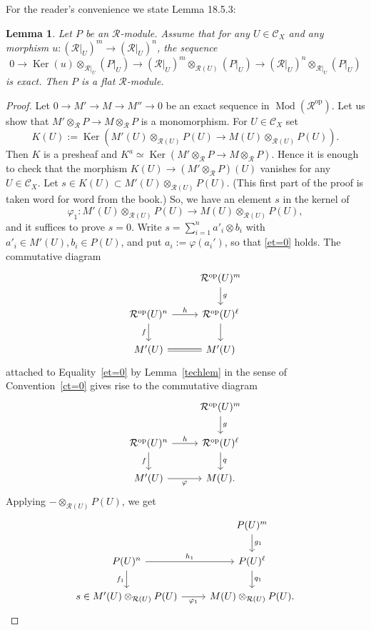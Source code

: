 \documentclass[12pt]{article}
\newtheorem{lem}[thm]{Lemma}
\theoremstyle{remark}
\theoremstyle{definition}
\newcommand{\cc}{\mathcal}
\newcommand{\C}{\mathcal C}
\DeclareMathOperator{\Ker}{Ker}
\DeclareMathOperator{\Mod}{Mod}
\DeclareMathOperator{\op}{op}
\begin{document}
For the reader's convenience we state Lemma 18.5.3: 
%
\begin{lem}\label{l1853}
Let $P$ be an $\cc R$-module. Assume that for any $U\in\C_X$ and any morphism $u:(\cc R|_U)^m\to(\cc R|_U)^n$, the sequence 
$$
0\to\Ker(u)\otimes_{\cc R|_U}(P|_U)\to(\cc R|_U)^m\otimes_{\cc R(U)}(P|_U)\to(\cc R|_U)^n\otimes_{\cc R|_U}(P|_U)
$$ 
is exact. Then $P$ is a flat $\cc R$-module.
\end{lem}
%
\begin{proof}
Let $0\to M'\to M\to M''\to0$ be an exact sequence in $\Mod(\cc R^{\op})$. Let us show that $M'\otimes_{\cc R}P\to M\otimes_{\cc R}P$ is a monomorphism. For $U\in\C_X$ set 
$$
K(U):=\Ker\left(M'(U)\otimes_{\cc R(U)}P(U)\to M(U)\otimes_{\cc R(U)}P(U)\right).
$$ 
Then $K$ is a presheaf and $K^a\simeq\Ker(M'\otimes_{\cc R}P\to M\otimes_{\cc R}P)$. Hence it is enough to check that the morphism $K(U)\to(M'\otimes_{\cc R}P)(U)$ vanishes for any $U\in\C_X$. Let $s\in K(U)\subset M'(U)\otimes_{\cc R(U)}P(U)$. (This first part of the proof is taken word for word from the book.) So, we have an element $s$ in the kernel of 
$$
\varphi_1:M'(U)\otimes_{\cc R(U)}P(U)\to M(U)\otimes_{\cc R(U)}P(U),
$$ 
and it suffices to prove $s=0$. Write $s=\sum_{i=1}^na'_i\otimes b_i$ with $a'_i\in M'(U),b_i\in P(U)$, and put $a_i:=\varphi(a_i')$, so that \eqref{et=0} holds. The commutative diagram 
$$
\begin{tikzcd}
{}&\cc R^{\op}(U)^m\ar{d}{g}\\ 
\cc R^{\op}(U)^n\ar{r}{h}\ar{d}[swap]{f}&\cc R^{\op}(U)^\ell\ar{d}\\ 
M'(U)\ar[equal]{r}&M'(U)
\end{tikzcd}
$$ 
attached to Equality~\eqref{et=0} by Lemma~\ref{techlem} in the sense of Convention~\ref{ct=0} gives rise to the commutative diagram 
%
\begin{equation}\label{d447}
\begin{tikzcd}
{}&\cc R^{\op}(U)^m\ar{d}{g}\\ 
\cc R^{\op}(U)^n\ar{r}{h}\ar{d}[swap]{f}&\cc R^{\op}(U)^\ell\ar{d}{q}\\ 
M'(U)\ar{r}[swap]{\varphi}&M(U).
\end{tikzcd}
\end{equation}
%
Applying $-\otimes_{\cc R(U)}P(U)$, we get 
$$
\begin{tikzcd}
{}&P(U)^m\ar{d}{g_1}\\ 
P(U)^n\ar{r}{h_1}\ar{d}[swap]{f_1}&P(U)^\ell\ar{d}{q_1}\\ 
s\in M'(U)\otimes_{\cc R(U)}P(U)\ar{r}[swap]{\varphi_1}&M(U)\otimes_{\cc R(U)}P(U).

\end{tikzcd}$$
\end{proof}
\end{document}
